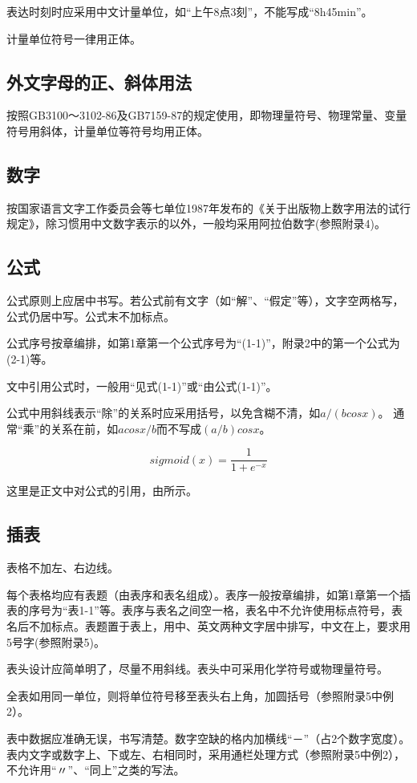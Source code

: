 表达时刻时应采用中文计量单位，如“上午8点3刻”，不能写成“8h45min”。

计量单位符号一律用正体。
\subsection{外文字母的正、斜体用法}
按照GB3100～3102-86及GB7159-87的规定使用，即物理量符号、物理常量、变量符号用斜体，计量单位等符号均用正体。

\subsection{数字}
按国家语言文字工作委员会等七单位1987年发布的《关于出版物上数字用法的试行规定》，除习惯用中文数字表示的以外，一般均采用阿拉伯数字(参照附录4)。

\subsection{公式}
公式原则上应居中书写。若公式前有文字（如“解”、“假定”等），文字空两格写，公式仍居中写。公式末不加标点。

公式序号按章编排，如第1章第一个公式序号为“(1-1)”，附录2中的第一个公式为(2-1)等。

文中引用公式时，一般用“见式(1-1)”或“由公式(1-1)”。

公式中用斜线表示“除”的关系时应采用括号，以免含糊不清，如$a/(bcosx)$。
通常“乘”的关系在前，如$a cosx / b$而不写成$(a/b)cosx$。

\begin{equation}
    sigmoid(x)=\frac{1}{1+e^{-x}}
    \label{Eq:1}
\end{equation}

这里是正文中对公式的引用，由所示。

\subsection{插表}
表格不加左、右边线。

每个表格均应有表题（由表序和表名组成）。表序一般按章编排，如第1章第一个插表的序号为“表1-1”等。表序与表名之间空一格，表名中不允许使用标点符号，表名后不加标点。表题置于表上，用中、英文两种文字居中排写，中文在上，要求用5号字(参照附录5)。

表头设计应简单明了，尽量不用斜线。表头中可采用化学符号或物理量符号。

全表如用同一单位，则将单位符号移至表头右上角，加圆括号（参照附录5中例2）。

表中数据应准确无误，书写清楚。数字空缺的格内加横线“－”（占2个数字宽度）。表内文字或数字上、下或左、右相同时，采用通栏处理方式（参照附录5中例2），不允许用“〃”、“同上”之类的写法。

